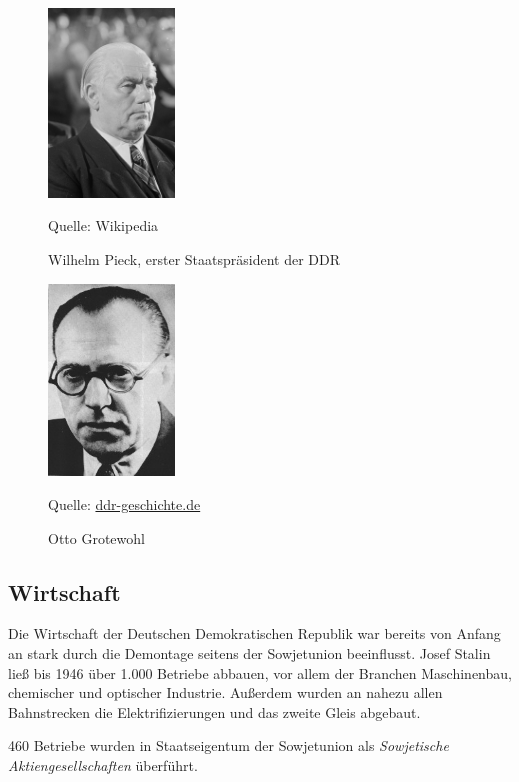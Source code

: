 \documentclass[12pt,a4paper]{article}
\begin{document}
\begin{figure}
    \centering
    \includegraphics[width=0.3\textwidth]{Bilder/Wilhelm-Pieck.jpg}
    \caption{Wilhelm Pieck, erster Staatspräsident der DDR}
    Quelle: Wikipedia
    \label{img:pieck}
\end{figure}

\begin{figure}
    \centering
    \includegraphics[width=0.3\textwidth]{Bilder/Otto-Grotewohl.jpg}
    \caption{Otto Grotewohl}
    Quelle: \url{ddr-geschichte.de}
    \label{img:grotewohl}
\end{figure}


\subsection{Wirtschaft}
\label{anfaenge:wirtschaft}

Die Wirtschaft der Deutschen Demokratischen Republik war bereits von Anfang an stark durch die Demontage seitens der Sowjetunion beeinflusst. Josef Stalin ließ bis 1946 über 1.000 Betriebe abbauen, vor allem der Branchen Maschinenbau, chemischer und optischer Industrie. Außerdem wurden an nahezu allen Bahnstrecken die Elektrifizierungen und das zweite Gleis abgebaut.

460 Betriebe wurden in Staatseigentum der Sowjetunion als \textit{Sowjetische Aktiengesellschaften} überführt.
\end{document}
